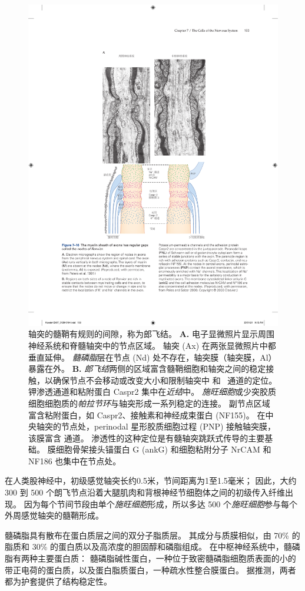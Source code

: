 \begin{figure}[htbp]
	\centering
	\includegraphics[width=0.75\linewidth]{chap07/fig_7_16}
	\caption{轴突的髓鞘有规则的间隙，称为郎飞结。
		\textbf{A.} 电子显微照片显示周围神经系统和脊髓轴突中的节点区域。
		轴突 (Ax) 在两张显微照片中都垂直延伸。
		\textit{髓磷脂}层在节点 (Nd) 处不存在，轴突膜（轴突膜，Al）暴露在外\cite{peters1991neuropil}。
		\textbf{B.} \textit{郎飞结}两侧的区域富含髓鞘细胞和轴突之间的稳定接触，以确保节点不会移动或改变大小和限制轴突中  和~ 通道的定位。
		钾渗透通道和粘附蛋白 Caspr2 集中在\textit{近结}中。
		\textit{施旺细胞}或少突胶质细胞细胞质的\textit{帕拉节环}与轴突形成一系列稳定的连接。
		副节点区域富含粘附蛋白，如 Caspr2、接触素和神经成束蛋白 (NF155)。
		在中央轴突的节点处，perinodal 星形胶质细胞过程 (PNP) 接触轴突膜，该膜富含  通道。
		 渗透性的这种定位是有髓轴突跳跃式传导的主要基础。
		膜细胞骨架接头锚蛋白 G (ankG) 和细胞粘附分子 NrCAM 和 NF186 也集中在节点处\cite{peles2000molecular}。}
	\label{fig:7_16}
\end{figure}


在人类股神经中，初级感觉轴突长约0.5米，节间距离为1至1.5毫米；
因此，大约 300 到 500 个朗飞节点沿着大腿肌肉和背根神经节细胞体之间的初级传入纤维出现。
因为每个节间节段由单个\textit{施旺细胞}形成，所以多达 500 个\textit{施旺细胞}参与每个外周感觉轴突的髓鞘形成。


髓磷脂具有散布在蛋白质层之间的双分子脂质层。
其成分与质膜相似，由 70\% 的脂质和 30\% 的蛋白质以及高浓度的胆固醇和磷脂组成。
在中枢神经系统中，髓磷脂有两种主要蛋白质：
髓磷脂碱性蛋白，一种位于致密髓磷脂细胞质表面的小的带正电荷的蛋白质，以及蛋白脂质蛋白，一种疏水性整合膜蛋白。
据推测，两者都为护套提供了结构稳定性。




